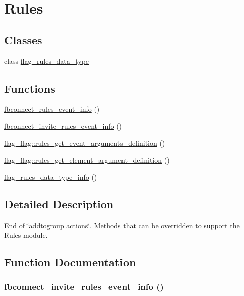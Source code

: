 \hypertarget{group__rules}{
\section{Rules}
\label{group__rules}
}
\subsection*{Classes}
\begin{CompactItemize}
\item 
class \hyperlink{classflag__rules__data__type}{flag\_\-rules\_\-data\_\-type}
\end{CompactItemize}
\subsection*{Functions}
\begin{CompactItemize}
\item 
\hyperlink{group__rules_g7b8c5825c911c7ac2679b1966f5c0987}{fbconnect\_\-rules\_\-event\_\-info} ()
\item 
\hyperlink{group__rules_gdf77486f867984539e5374c9fc963a66}{fbconnect\_\-invite\_\-rules\_\-event\_\-info} ()
\item 
\hyperlink{group__rules_g21a07dbe1a9e496438d235e95e67c048}{flag\_\-flag::rules\_\-get\_\-event\_\-arguments\_\-definition} ()
\item 
\hyperlink{group__rules_g88951558f573d816de08b9e9d49ff4c2}{flag\_\-flag::rules\_\-get\_\-element\_\-argument\_\-definition} ()
\item 
\hyperlink{group__rules_g79d47f2b9589f76b339066ca3d6dee1e}{flag\_\-rules\_\-data\_\-type\_\-info} ()
\end{CompactItemize}


\subsection{Detailed Description}
End of \char`\"{}addtogroup actions\char`\"{}. Methods that can be overridden to support the Rules module. 

\subsection{Function Documentation}
\hypertarget{group__rules_gdf77486f867984539e5374c9fc963a66}{
\subsubsection[{fbconnect\_\-invite\_\-rules\_\-event\_\-info}]{\setlength{\rightskip}{0pt plus 5cm}fbconnect\_\-invite\_\-rules\_\-event\_\-info ()}}
\label{group__rules_gdf77486f867984539e5374c9fc963a66}


